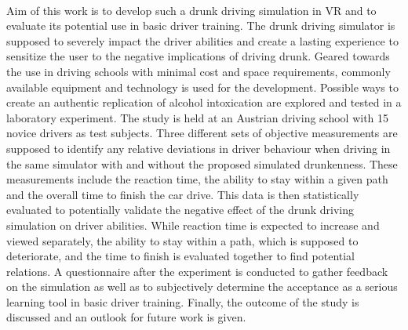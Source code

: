 \\
Aim of this work is to develop such a drunk driving simulation in VR and to evaluate its potential use in basic driver training.
The drunk driving simulator is supposed to severely impact the driver abilities and create a lasting experience to sensitize the user to the negative implications of driving drunk.
Geared towards the use in driving schools with minimal cost and space requirements, commonly available equipment and technology is used for the development. 
Possible ways to create an authentic replication of alcohol intoxication are explored and tested in a laboratory experiment.
The study is held at an Austrian driving school with 15 novice drivers as test subjects.
Three different sets of objective measurements are supposed to identify any relative deviations in driver behaviour when driving in the same simulator with and without the proposed simulated drunkenness.
These measurements include the reaction time, the ability to stay within a given path and the overall time to finish the car drive.
This data is then statistically evaluated to potentially validate the negative effect of the drunk driving simulation on driver abilities.
While reaction time is expected to increase and viewed separately, the ability to stay within a path, which is supposed to deteriorate, and the time to finish is evaluated together to find potential relations. 
A questionnaire after the experiment is conducted to gather feedback on the simulation as well as to subjectively determine the acceptance as a serious learning tool in basic driver training.
Finally, the outcome of the study is discussed and an outlook for future work is given. 



